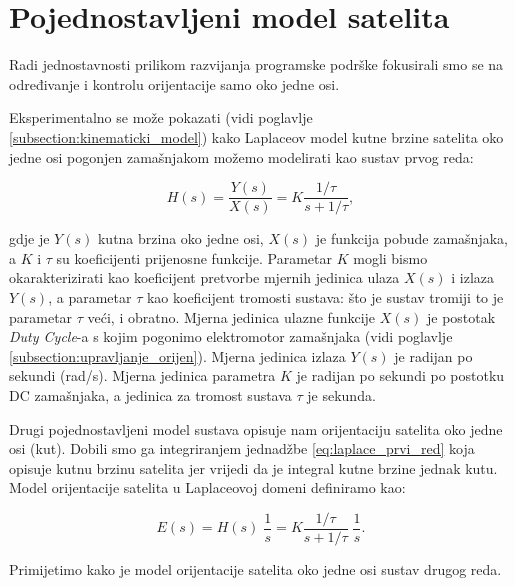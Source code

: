 \documentclass[times, utf8, diplomski, numeric]{templates/template}
\begin{document}
{    \section{Pojednostavljeni model satelita}{
    \label{section:pojednostavljeni_model_satelita}
        Radi jednostavnosti prilikom razvijanja programske podrške fokusirali smo se na određivanje i kontrolu orijentacije samo oko jedne osi. 

        Eksperimentalno se može pokazati (vidi poglavlje \ref{subsection:kinematicki_model}) kako Laplaceov model kutne brzine satelita oko jedne osi pogonjen zamašnjakom možemo modelirati kao sustav prvog reda:

        \begin{equation}
        \label{eq:laplace_prvi_red}
        H(s) = \frac{Y(s)}{X(s)} = K \frac{1/\tau}{s + 1/\tau},
        \end{equation}

        gdje je $Y(s)$ kutna brzina oko jedne osi, $X(s)$ je funkcija pobude zamašnjaka, a $K$ i $\tau$ su koeficijenti prijenosne funkcije. Parametar $K$ mogli bismo okarakterizirati kao koeficijent pretvorbe mjernih jedinica ulaza $X(s)$ i izlaza $Y(s)$, a parametar $\tau$ kao koeficijent tromosti sustava: što je sustav tromiji to je parametar $\tau$ veći, i obratno. Mjerna jedinica ulazne funkcije $X(s)$ je postotak \emph{Duty Cycle}-a s kojim pogonimo elektromotor zamašnjaka (vidi poglavlje \ref{subsection:upravljanje_orijen}). Mjerna jedinica izlaza $Y(s)$ je radijan po sekundi (rad/s). Mjerna jedinica parametra $K$ je radijan po sekundi po postotku DC zamašnjaka, a jedinica za tromost sustava $\tau$ je sekunda.

        Drugi pojednostavljeni model sustava opisuje nam orijentaciju satelita oko jedne osi (kut). Dobili smo ga integriranjem jednadžbe \ref{eq:laplace_prvi_red} koja opisuje kutnu brzinu satelita jer vrijedi da je integral kutne brzine jednak kutu. Model orijentacije satelita u Laplaceovoj domeni definiramo kao:

        \begin{equation}
        \label{eq:laplace_drugi_red}
            E(s) = H(s) \; \frac{1}{s} = K \frac{1/\tau}{s + 1/\tau} \; \frac{1}{s}.
        \end{equation}

        Primijetimo kako je model orijentacije satelita oko jedne osi sustav drugog reda.
    }
}
\end{document}
